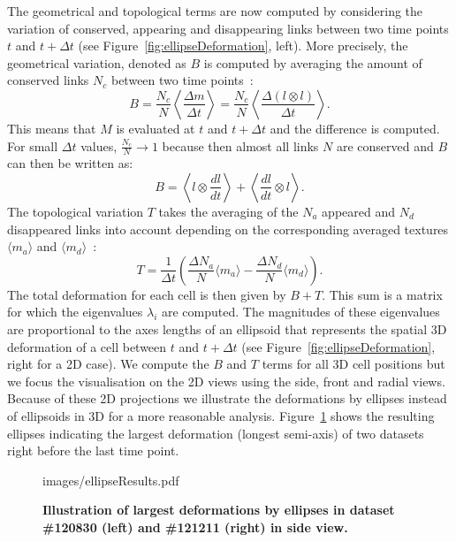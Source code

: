 \documentclass[11pt,a4paper, final]{article}
\begin{document}
\noindent
The geometrical and topological terms are now computed by considering the variation of conserved, appearing and disappearing links between two time points $t$ and $t + \Delta t$ (see Figure~\ref{fig:ellipseDeformation}, left). More precisely, the geometrical variation, denoted as $B$ is computed by averaging the amount of conserved links $N_c$ between two time points~\cite{graner_et_al_2008}:
\begin{equation}
B = \frac{N_c}{N} \left\langle \frac{\Delta m}{\Delta t} \right\rangle = \frac{N_c}{N} \left\langle \frac{\Delta (l \otimes l) }{\Delta t} \right\rangle.
\end{equation}
This means that $M$ is evaluated at $t$ and $t + \Delta t$ and the difference is computed. For small $\Delta t$ values, $\frac{N_c}{N} \rightarrow 1$ because then almost all links $N$ are conserved and $B$ can then be written as:
\begin{equation}
B = \left\langle l \otimes \frac{dl}{dt} \right\rangle + \left\langle \frac{dl}{dt} \otimes l \right\rangle.
\end{equation}
The topological variation $T$ takes the averaging of the $N_a$ appeared and $N_d$ disappeared links into account depending on the corresponding averaged textures $\langle m_a \rangle$ and $\langle m_d \rangle$~\cite{graner_et_al_2008}:
\begin{equation}
T = \frac{1}{\Delta t} \left( \frac{\Delta N_a}{N} \langle m_a \rangle - \frac{\Delta N_d}{N} \langle m_d \rangle \right).
\end{equation}
The total deformation for each cell is then given by $B+T$. This sum is a matrix for which the eigenvalues $\lambda_i$ are computed. The magnitudes of these eigenvalues are proportional to the axes lengths of an ellipsoid that represents the spatial 3D deformation of a cell between $t$ and $t + \Delta t$ (see Figure~\ref{fig:ellipseDeformation}, right for a 2D case). We compute the $B$ and $T$ terms for all 3D cell positions but we focus the visualisation on the 2D views using the side, front and radial views. Because of these 2D projections we illustrate the deformations by ellipses instead of ellipsoids in 3D for a more reasonable analysis. Figure~\ref{fig:ellipseResults} shows the resulting ellipses indicating the largest deformation (longest semi-axis) of two datasets right before the last time point.
%
\begin{figure}[htbp]
	\begin{center}
		\begin{overpic}[width=1.\linewidth]{images/ellipseResults.pdf}
		\end{overpic}
\caption[]
{
{\bf Illustration of largest deformations by ellipses in dataset \#120830 (left) and \#121211 (right) in side view.}
}
	\label{fig:ellipseResults}
	\end{center}
\end{figure}
%
\end{document}
